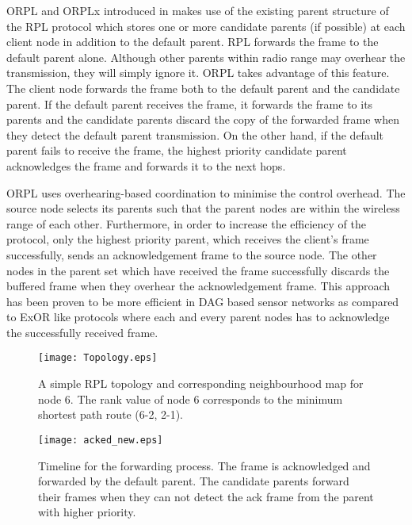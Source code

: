\documentclass[conference]{IEEEtran}
\begin{document}
ORPL and ORPLx introduced in \cite{orpl-tpds} makes use of 
the existing parent structure of the RPL protocol which stores 
one or more candidate parents (if possible) at each 
client node in addition to the default parent. 
RPL forwards the frame to the default parent alone.
Although other parents within radio range may overhear the transmission, they will simply ignore it.
ORPL takes advantage of this feature. The client node forwards the frame both to the default parent and the candidate parent. If the default parent
receives the frame, it forwards the frame to its parents and
the candidate parents discard the copy of the forwarded frame when they detect the default parent transmission. On the other hand, if the default parent fails to receive the frame, the highest priority candidate parent acknowledges the frame and forwards it to the next hops.

ORPL uses overhearing-based coordination to minimise the control
overhead. The source node selects its parents such that the parent nodes 
are within the wireless range of each other. Furthermore, in order to increase the efficiency of the protocol, only the highest priority parent, which receives the client's frame successfully, sends an acknowledgement frame to the source node. The other nodes in the parent set which have received the frame successfully discards the buffered frame when they overhear the acknowledgement frame. This approach has been proven to be more efficient in DAG based sensor networks \cite{orpl-tpds} as compared to ExOR \cite{Biswas2004} like protocols where each and every parent nodes has to acknowledge the successfully received frame.    

\begin{figure}
 \centering
   \texttt{[image: Topology.eps]} \caption{A simple RPL topology and corresponding neighbourhood map
    for node 6. The rank value of node 6 corresponds to the minimum
    shortest path route (6-2, 2-1).}
    \label{fig.topologymap}
\end{figure}

\begin{figure}
\centering
   \texttt{[image: acked\_new.eps]}
\caption{Timeline for the forwarding process. The frame is acknowledged and
forwarded by the default parent. The candidate parents forward their
frames when they can not detect the ack frame from the parent with higher priority.}
\label{fig.timeline}
\end{figure}
\end{document}
